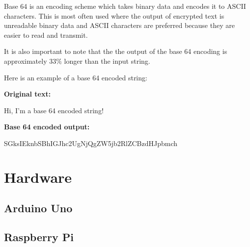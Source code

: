 Base 64 is an encoding scheme which takes binary data and encodes it to ASCII characters. This
is most often used where the output of encrypted text is unreadable binary data and ASCII
characters are preferred because they are easier to read and transmit. 

It is also important to note that the the output of the base 64 encoding is approximately
33\% longer than the input string.

Here is an example of a base 64 encoded string:

\textbf{Original text:}

Hi, I'm a base 64 encoded string!

\textbf{Base 64 encoded output:}

SGksIEknbSBhIGJhc2UgNjQgZW5jb2RlZCBzdHJpbmch

\section{Hardware}

\subsection{Arduino Uno}

\subsection{Raspberry Pi}
